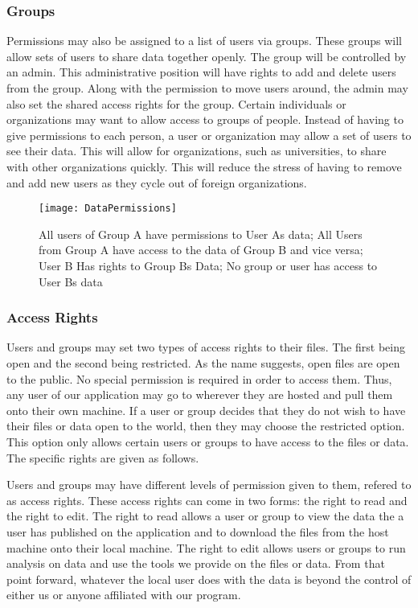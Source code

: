 \subsubsection{Groups}
Permissions may also be assigned to a list of users via groups. These groups will allow sets of users to share data together openly. The group will be controlled by an admin. This administrative position will have rights to add and delete users from the group. Along with the permission to move users around, the admin may also set the shared access rights for the group. Certain individuals or organizations may want to allow access to groups of people. Instead of having to give permissions to each person, a user or organization may allow a set of users to see their data. This will allow for organizations, such as universities, to share with other organizations quickly. This will reduce the stress of having to remove and add new users as they cycle out of foreign organizations.

\begin{figure}[t]
  \begin{center}
  \captionsetup{width=.8\linewidth}
  \texttt{[image: DataPermissions]}
  \caption{All users of Group A have permissions to User A\textquotesingle s data; All Users from Group A have access to the data of Group B and vice versa; User B Has rights to Group B\textquotesingle s Data; No group or user has access to User B\textquotesingle s data}
  \end{center}
\end{figure}

\subsubsection{Access Rights}
Users and groups may set two types of access rights to their files. The first being open and the second being restricted. As the name suggests, open files are open to the public. No special permission is required in order to access them. Thus, any user of our application may go to wherever they are hosted and pull them onto their own machine. If a user or group decides that they do not wish to have their files or data open to the world, then they may choose the restricted option. This option only allows certain users or groups to have access to the files or data. The specific rights are given as follows.\par
Users and groups may have different levels of permission given to them, refered to as access rights. These access rights can come in two forms: the right to read and the right to edit. The right to read allows a user or group to view the data the a user has published on the application and to download the files from the host machine onto their local machine. The right to edit allows users or groups to run analysis on data and use the tools we provide on the files or data. From that point forward, whatever the local user does with the data is beyond the control of either us or anyone affiliated with our program.
